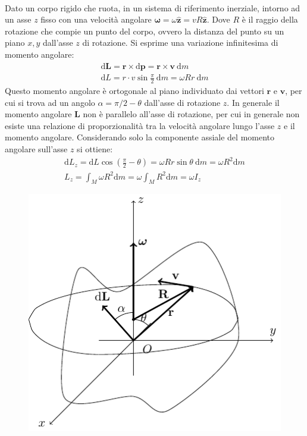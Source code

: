 \documentclass{article}
\newcommand{\vect}[1]{\boldsymbol{\mathbf{#1}}}
\newcommand{\df}{\mathrm{d}}
\numberwithin{equation}{subsection}
\begin{document}
\\
Dato un corpo rigido che ruota, in un sistema di riferimento inerziale, intorno ad un asse $z$ fisso con una 
velocità angolare $\vect{\omega}=\omega\hat{\vect{z}}=vR\hat{\vect{z}}$. Dove 
$R$ è il raggio della rotazione che compie un punto del corpo, ovvero la distanza del punto su un piano $x,y$ 
dall'asse $z$ di rotazione. Si esprime una variazione infinitesima di momento angolare: 
\begin{gather*}
    \df\vect{L}=\vect{r}\times \df\vect{p}=\vect{r}\times\vect{v}\:\df m\\
    \df L=r\cdot v\sin\displaystyle\frac{\pi}{2}\:\df m=\omega Rr\:\df m
\end{gather*}
Questo momento angolare è ortogonale al piano individuato dai vettori $\vect{r}$ e $\vect{v}$, per cui si trova ad un angolo $\alpha={\pi}/{2}-\theta$ dall'asse 
di rotazione $z$. In generale il momento angolare $\vect{L}$ non è parallelo all'asse di rotazione, per cui in generale non esiste una relazione di proporzionalità tra la velocità angolare 
lungo l'asse $z$ e il momento angolare. Considerando solo la componente assiale del momento angolare sull'asse $z$ si ottiene: 
\begin{gather*}
    \df L_z=\df L\cos\left(\displaystyle\frac{\pi}{2}-\theta\right)=\omega Rr\sin\theta\:\df m=\omega R^2\df m\\
    L_z=\displaystyle\int_M\omega R^2\df m=\omega\int_M R^2\df m=\omega I_z
\end{gather*}

\begin{figure}[H]%
    \centering
    \includegraphics{corpo-rigido.pdf}%
\end{figure}
\end{document}
